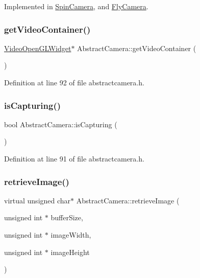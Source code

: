 Implemented in \mbox{\hyperlink{class_spin_camera_ad3b02eb926fbc4312e7f19e3834db576}{Spin\+Camera}}, and \mbox{\hyperlink{class_fly_camera_a97938fec7396d02574383f7db50d9e58}{Fly\+Camera}}.

\mbox{\label{class_abstract_camera_a0236b61264a6659a05475896ab167da4}} 
\subsubsection{\texorpdfstring{getVideoContainer()}{getVideoContainer()}}
{\footnotesize\ttfamily \mbox{\hyperlink{class_video_open_g_l_widget}{Video\+Open\+G\+L\+Widget}}$\ast$ Abstract\+Camera\+::get\+Video\+Container (\begin{DoxyParamCaption}{ }\end{DoxyParamCaption})\hspace{0.3cm}{\ttfamily [inline]}}



Definition at line 92 of file abstractcamera.\+h.

\mbox{\label{class_abstract_camera_a6a5f894f0e605991aed6c85279efc3a0}} 
\subsubsection{\texorpdfstring{isCapturing()}{isCapturing()}}
{\footnotesize\ttfamily bool Abstract\+Camera\+::is\+Capturing (\begin{DoxyParamCaption}{ }\end{DoxyParamCaption})\hspace{0.3cm}{\ttfamily [inline]}}



Definition at line 91 of file abstractcamera.\+h.

\mbox{\label{class_abstract_camera_a46f1a355c0dbfe5dd66016faefc97eba}} 
\subsubsection{\texorpdfstring{retrieveImage()}{retrieveImage()}}
{\footnotesize\ttfamily virtual unsigned char$\ast$ Abstract\+Camera\+::retrieve\+Image (\begin{DoxyParamCaption}\item[{unsigned int $\ast$}]{buffer\+Size,  }\item[{unsigned int $\ast$}]{image\+Width,  }\item[{unsigned int $\ast$}]{image\+Height }\end{DoxyParamCaption})\hspace{0.3cm}{\ttfamily [pure virtual]}}



